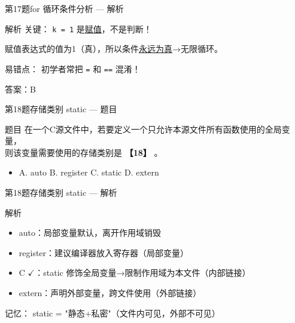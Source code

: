 \begin{frame}{第17题}{for 循环条件分析 --- 解析}
    \begin{alertblock}{解析}
        \footnotesize
        {\color{highlight}关键：} \texttt{k = 1} 是\underline{赋值}，不是判断！

        赋值表达式的值为1（真），所以条件\underline{永远为真}→无限循环。

        \vspace{0.2em}
        {\color{highlight}易错点：} 初学者常把 \texttt{=} 和 \texttt{==} 混淆！

        \vspace{0.2em}
        {\color{highlight}答案：B}
    \end{alertblock}
\end{frame}

\begin{frame}{第18题}{存储类别 static --- 题目}
    \begin{exampleblock}{题目}
        \footnotesize 在一个C源文件中，若要定义一个只允许本源文件所有函数使用的全局变量，\\
        则该变量需要使用的存储类别是 \textbf{【18】} 。
        \begin{itemize}
            \setlength{\itemsep}{0pt}
            \item A. auto \quad B. register \quad C. static \quad D. extern
        \end{itemize}
    \end{exampleblock}
\end{frame}

\begin{frame}{第18题}{存储类别 static --- 解析}
    \begin{alertblock}{解析}
        \footnotesize
        \begin{itemize}
            \setlength{\itemsep}{0pt}
            \item auto：局部变量默认，离开作用域销毁
            \item register：建议编译器放入寄存器（局部变量）
            \item {\color{highlight}C $\checkmark$：static 修饰全局变量→限制作用域为本文件（内部链接）}
            \item extern：声明外部变量，跨文件使用（外部链接）
        \end{itemize}
        \vspace{0.3em}
        {\color{highlight}记忆：} static = "静态+私密"（文件内可见，外部不可见）
    \end{alertblock}
\end{frame}

